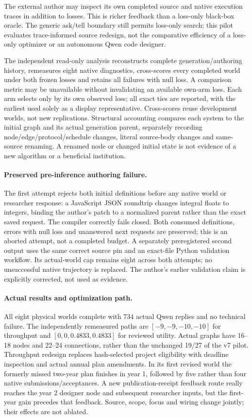 The external author may inspect its own completed source and native execution
traces in addition to losses. This is richer feedback than a loss-only
black-box oracle. The generic ask/tell boundary still permits loss-only search;
this pilot evaluates trace-informed source redesign, not the comparative
efficiency of a loss-only optimizer or an autonomous Qwen code designer.

The independent read-only analysis reconstructs complete generation/authoring
history, remeasures eight native diagnostics, cross-scores every completed
world under both frozen losses and retains all failures with null loss. A
comparison metric may be unavailable without invalidating an available own-arm
loss. Each arm selects only by its own observed loss; all exact ties are
reported, with the earliest used solely as a display representative. Cross-scores
reuse development worlds, not new replications. Structural accounting compares
each system to the initial graph and its actual generation parent, separately
recording node/edge/protocol/schedule changes, literal source-body changes and
same-source renaming. A renamed node or changed initial state is not evidence
of a new algorithm or a beneficial institution.

\paragraph{Preserved pre-inference authoring failure.}
The first attempt rejects both initial definitions before any native world or
researcher response: a JavaScript JSON roundtrip changes integral floats to
integers, binding the author's patch to a normalized parent rather than the
exact saved request. The compiler correctly fails closed. Both consumed
definitions, errors with null loss and unanswered next requests are preserved;
this is an aborted attempt, not a completed budget. A separately preregistered
second output uses the same correct source pin and an exact-file Python
validation workflow. Its actual-world cap remains eight across both attempts;
no unsuccessful native trajectory is replaced. The author's earlier validation
claim is explicitly corrected, not used as evidence.

\paragraph{Actual results and optimization path.}
All eight physical worlds complete with 734 actual Qwen replies and no technical
failure. The independently remeasured paths are $[-9,-9,-10,-10]$ for throughput
and $[0,0,0.4833,0.4833]$ for reviewed utility. Actual graphs have 16--18 nodes
and 22--24 connections, rather than the unchanged 19/27 of the v7 pilot.
Throughput redesign replaces hash-selected project eligibility with deadline
inspection and actual annual plan amendments. In its first revised world the
formerly missed two-year plan finishes in year 1, followed by five rather than
four native submissions/acceptances. A new publication-receipt feedback route
really reaches the year 2 designer node and subsequent researcher inputs, but
the first-year gain precedes that feedback. Source, scope, focus and wiring
change jointly; their effects are not ablated.

